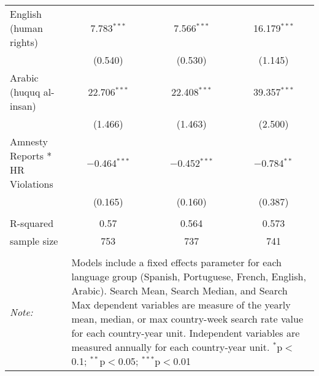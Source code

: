 \begin{table}[!htbp]
\begin{tabular}{@{\extracolsep{5pt}}lccc}
  English (human rights) & 7.783$^{***}$ & 7.566$^{***}$ & 16.179$^{***}$ \\ 
  & (0.540) & (0.530) & (1.145) \\ 
  Arabic (huquq al-insan) & 22.706$^{***}$ & 22.408$^{***}$ & 39.357$^{***}$ \\ 
  & (1.466) & (1.463) & (2.500) \\ 
  Amnesty Reports * HR Violations & $-$0.464$^{***}$ & $-$0.452$^{***}$ & $-$0.784$^{**}$ \\ 
  & (0.165) & (0.160) & (0.387) \\ 
 \hline \\[-1.8ex] 
R-squared  & 0.57 & 0.564 & 0.573 \\ 
sample size  & 753 & 737 & 741 \\ 
\hline 
\hline \\[-1.8ex] 
\textit{Note:}  & \multicolumn{3}{l}{\parbox[t]{8cm}{Models include a fixed effects parameter for each language group (Spanish, Portuguese, French, English, Arabic). Search Mean, Search Median, and Search Max dependent variables are measure of the yearly mean, median, or max country-week search rate value for each country-year unit. Independent variables are measured annually for each country-year unit. $^{*}$p$<$0.1; $^{**}$p$<$0.05; $^{***}$p$<$0.01}} \\ 
\end{tabular} 
\end{table} 
